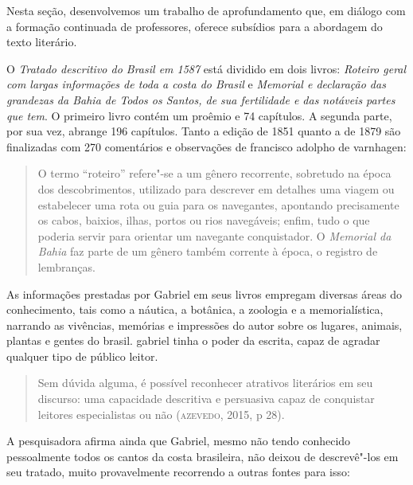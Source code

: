 \documentclass[12pt]{extarticle}
\begin{document}
Nesta seção, desenvolvemos um trabalho de aprofundamento que, em diálogo
com a formação continuada de professores, oferece subsídios para a
abordagem do texto literário.

O \textit{Tratado descritivo do Brasil em 1587} está dividido em dois livros:
\textit{Roteiro geral com largas informações de toda a costa do Brasil} e
\textit{Memorial e declaração das grandezas da Bahia de Todos os Santos, de sua
fertilidade e das notáveis partes que tem}. O primeiro livro contém um
proêmio e 74 capítulos. A segunda parte, por sua vez, abrange 196
capítulos. Tanto a edição de 1851 quanto a de 1879 são finalizadas com
270 comentários e observações de francisco adolpho de varnhagen:


\begin{quote}
O termo ``roteiro'' refere"-se a um gênero recorrente, sobretudo na época
dos descobrimentos, utilizado para descrever em detalhes uma viagem ou
estabelecer uma rota ou guia para os navegantes, apontando precisamente
os cabos, baixios, ilhas, portos ou rios navegáveis; enfim, tudo o que
poderia servir para orientar um navegante conquistador. O \textit{Memorial da
Bahia} faz parte de um gênero também corrente à época, o registro de
lembranças.
\end{quote}

As informações prestadas por Gabriel em seus livros empregam diversas
áreas do conhecimento, tais como a náutica, a botânica, a zoologia e a
memorialística, narrando as vivências, memórias e impressões do autor
sobre os lugares, animais, plantas e gentes do brasil. gabriel tinha o
poder da escrita, capaz de agradar qualquer tipo de público leitor.

\begin{quote}
Sem dúvida alguma, é possível reconhecer atrativos literários em seu
discurso: uma capacidade descritiva e persuasiva capaz de conquistar
leitores especialistas ou não (\textsc{azevedo}, 2015, p 28).
\end{quote}

A pesquisadora afirma ainda que Gabriel, mesmo não tendo conhecido
pessoalmente todos os cantos da costa brasileira, não deixou de
descrevê"-los em seu tratado, muito provavelmente recorrendo a outras
fontes para isso:
\end{document}
